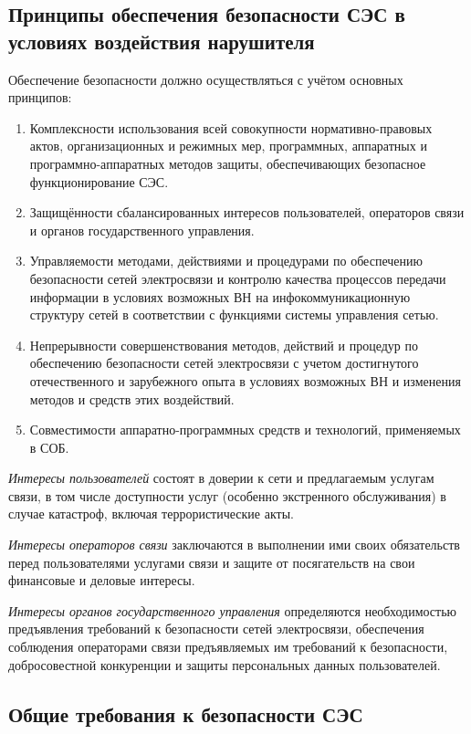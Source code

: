 \documentclass[12pt, russian, oneside, article]{ncc}
\begin{document}
\subsection{Принципы обеспечения безопасности СЭС в условиях воздействия нарушителя}
\label{sec-1_4}


Обеспечение безопасности должно осуществляться с учётом основных принципов:
\begin{enumerate}
\item Комплексности использования всей совокупности нормативно-правовых актов, организационных и режимных мер, программных, аппаратных и программно-аппаратных методов защиты, обеспечивающих безопасное функционирование СЭС.
\item Защищённости сбалансированных интересов пользователей, операторов связи и органов государственного управления.
\item Управляемости методами, действиями и процедурами по обеспечению безопасности сетей электросвязи и контролю качества процессов передачи информации в условиях возможных ВН на инфокоммуникационную структуру сетей в соответствии с функциями системы управления сетью.
\item Непрерывности совершенствования методов, действий и процедур по обеспечению безопасности сетей электросвязи с учетом достигнутого отечественного и зарубежного опыта в условиях возможных ВН и изменения методов и средств этих воздействий.
\item Совместимости аппаратно-программных средств и технологий, применяемых в СОБ.
\end{enumerate}

\emph{Интересы пользователей} состоят в доверии к сети и предлагаемым услугам связи, в том числе доступности услуг (особенно экстренного обслуживания) в случае катастроф, включая террористические акты.

\emph{Интересы операторов связи} заключаются в выполнении ими своих обязательств перед пользователями услугами связи и защите от посягательств на свои финансовые и деловые интересы.

\emph{Интересы органов государственного управления} определяются необходимостью предъявления требований к безопасности сетей электросвязи, обеспечения соблюдения операторами связи предъявляемых им требований к безопасности, добросовестной конкуренции и защиты персональных данных пользователей.
\subsection{Общие требования к безопасности СЭС}
\label{sec-1_5}
\end{document}
